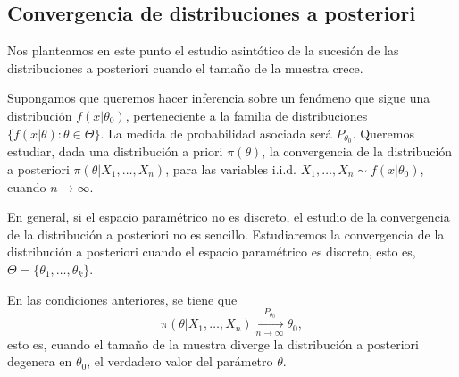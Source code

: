 \documentclass{article}
\begin{document}
\subsection{Convergencia de distribuciones a posteriori} \label{sec:bayes:convergencia}

Nos planteamos en este punto el estudio asintótico de la sucesión de las distribuciones a posteriori cuando el tamaño de la muestra crece.

Supongamos que queremos hacer inferencia sobre un fenómeno que sigue una distribución $f(x|\theta_0)$, perteneciente a la familia de distribuciones $\{f(x|\theta) : \theta\in\Theta\}$. La medida de probabilidad asociada será $P_{\theta_0}$. Queremos estudiar, dada una distribución a priori $\pi(\theta)$, la convergencia de la distribución a posteriori $\pi(\theta|X_1,\ldots,X_n)$, para las variables i.i.d. $X_1,\ldots,X_n \sim f(x|\theta_0)$,  cuando $n \to \infty$.

En general, si el espacio paramétrico no es discreto, el estudio de la convergencia de la distribución a posteriori no es sencillo. Estudiaremos la convergencia de la distribución a posteriori cuando el espacio paramétrico es discreto, esto es, $\Theta = \{\theta_1,\ldots,\theta_k\}$.

\begin{thm}
	En las condiciones anteriores, se tiene que
	\[\pi(\theta|X_1,\ldots,X_n) \xrightarrow[n\to\infty]{P_{\theta_0}} \theta_0,\]
    esto es, cuando el tamaño de la muestra diverge la distribución a posteriori degenera en $\theta_0$, el verdadero valor del parámetro $\theta$.
\end{thm}
\end{document}
